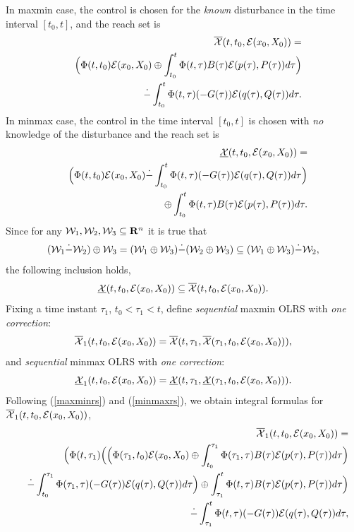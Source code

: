 \documentclass{report}
\newcommand{\EE}{{\cal E}}
\newcommand{\WW}{{\cal W}}
\newcommand{\XX}{{\cal X}}
\begin{document}
In maxmin case, the control is chosen for the \emph{known} disturbance
in the time interval $[t_0,t]$, and the reach set is
\begin{eqnarray}
&& \overline{\XX}(t,t_0,\EE(x_0,X_0)) = \nonumber\\
&& \Big{(}\Phi(t,t_0)\EE(x_0,X_0)\oplus
\int_{t_0}^t\Phi(t,\tau)B(\tau)\EE(p(\tau),P(\tau))d\tau\Big{)} \nonumber\\
&& \dot{-}\int_{t_0}^t\Phi(t,\tau)(-G(\tau))\EE(q(\tau),Q(\tau))d\tau.
\label{maxminrs}
\end{eqnarray}
In minmax case, the control in the time interval $[t_0,t]$ is chosen with \emph{no}
knowledge of the disturbance and the reach set is
\begin{eqnarray}
&& \underline{\XX}(t,t_0,\EE(x_0,X_0)) = \nonumber\\
&& \Big{(}\Phi(t,t_0)\EE(x_0,X_0)\dot{-}
\int_{t_0}^t\Phi(t,\tau)(-G(\tau))\EE(q(\tau),Q(\tau))d\tau\Big{)} \nonumber\\
&& \oplus\int_{t_0}^t\Phi(t,\tau)B(\tau)\EE(p(\tau),P(\tau))d\tau.
\label{minmaxrs}
\end{eqnarray}
Since for any $\WW_1,\WW_2,\WW_3\subseteq{\bf R}^n$ it is true that
\begin{equation}
(\WW_1\dot{-}\WW_2)\oplus\WW_3 =
(\WW_1\oplus\WW_3)\dot{-}(\WW_2\oplus\WW_3) \subseteq
(\WW_1\oplus\WW_3)\dot{-}\WW_2, \label{gdiffinc}
\end{equation}
the following inclusion holds,
\[ \underline{\XX}(t,t_0,\EE(x_0,X_0)) \subseteq
\overline{\XX}(t,t_0,\EE(x_0,X_0)) .\]
Fixing a time instant $\tau_1$, $t_0<\tau_1<t$, define
{\it sequential} maxmin OLRS with {\it one correction}:
\[ \overline{\XX}_1(t,t_0,\EE(x_0,X_0)) =
\overline{\XX}(t,\tau_1,\overline{\XX}(\tau_1,t_0,\EE(x_0,X_0))), \]
and {\it sequential} minmax OLRS with {\it one correction}:
\[ \underline{\XX}_1(t,t_0,\EE(x_0,X_0)) =
\underline{\XX}(t,\tau_1,\underline{\XX}(\tau_1,t_0,\EE(x_0,X_0))). \]
Following (\ref{maxminrs}) and (\ref{minmaxrs}), we obtain integral
formulas for $\overline{\XX}_1(t,t_0,\EE(x_0,X_0))$,
\begin{eqnarray*}
&& \overline{\XX}_1(t,t_0,\EE(x_0,X_0)) = \\
&& \Big{(}\Phi(t,\tau_1)\Big{(}\Big{(}\Phi(\tau_1,t_0)\EE(x_0,X_0)\oplus
\int_{t_0}^{\tau_1}\Phi(\tau_1,\tau)B(\tau)\EE(p(\tau),P(\tau))d\tau\Big{)}\\
&& \dot{-}\int_{t_0}^{\tau_1}
\Phi(\tau_1,\tau)(-G(\tau))\EE(q(\tau),Q(\tau))d\tau\Big{)}
\oplus \int_{\tau_1}^t\Phi(t,\tau)B(\tau)\EE(p(\tau),P(\tau))d\tau\Big{)} \\
&& \dot{-}\int_{\tau_1}^{t}\Phi(t,\tau)(-G(\tau))\EE(q(\tau),Q(\tau))d\tau,
\end{eqnarray*}
\end{document}
